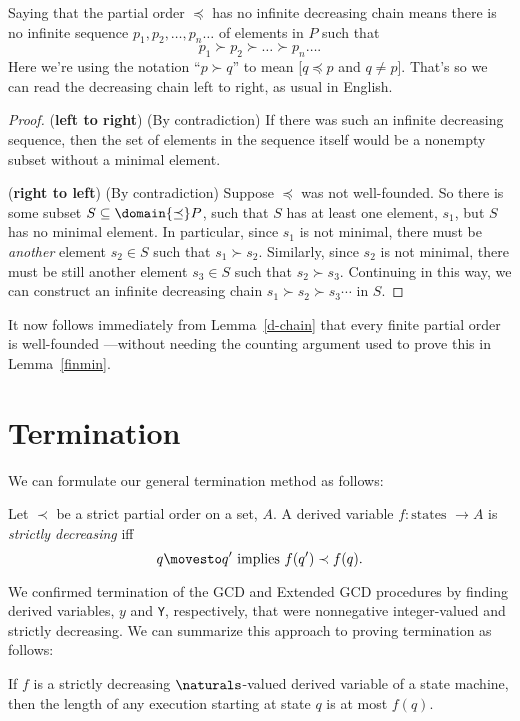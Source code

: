 Saying that the partial order $\preceq$ has no infinite decreasing chain
means there is no infinite sequence $p_1,p_2,\dots,p_n\dots$ of elements
in $P$ such that
\[
p_1 \succ p_2 \succ \dots \succ p_n \dots.
\]
Here we're using the notation ``$p \succ q$'' to mean [$q \preceq p$ and
  $q \neq p$].  That's so we can read the decreasing chain left to right,
as usual in English.

\begin{proof}
(\textbf{left to right}) (By contradiction) If there was such an infinite
decreasing sequence, then the set of elements in the sequence itself would
be a nonempty subset without a minimal element.

(\textbf{right to left}) (By contradiction) Suppose $\preceq$ was not
well-founded.  So there is some subset $S \subseteq \domain{\preceq}P$,
such that $S$ has at least one element, $s_1$, but $S$ has no minimal
element.  In particular, since $s_1$ is not minimal, there must be
\emph{another} element $s_2 \in S$ such that $s_1 \succ s_2$.  Similarly,
since $s_2$ is not minimal, there must be still another element $s_3 \in S$
such that $s_2 \succ s_3$.  Continuing in this way, we can construct an
infinite decreasing chain $s_1 \succ s_2 \succ s_3 \cdots$ in $S$.
\end{proof}

It now follows immediately from Lemma~\ref{d-chain} that every finite
partial order is well-founded ---without needing the counting argument
used to prove this in Lemma~\ref{finmin}.

\begin{problems}
\practiceproblems
{}
\end{problems}


\section{Termination}

We can formulate our general termination method as follows:

\begin{definition}
  Let $\prec$ be a strict partial order on a set, $A$.  A derived variable
  $f : \text{states } \to A$ is \emph{strictly decreasing} iff
\[
q \movesto q' \text{  implies  } f(q') \prec f(q).
\]
\end{definition}

We confirmed termination of the GCD and Extended GCD procedures by finding
derived variables, $y$ and \texttt{Y}, respectively, that were nonnegative
integer-valued and strictly decreasing.  We can summarize this approach to
proving termination as follows:
\begin{theorem}
\label{th:decr}
If $f$ is a strictly decreasing $\naturals$-valued derived variable of a
state machine, then the length of any execution starting at state $q$ is
at most $f(q)$.
\end{theorem}

